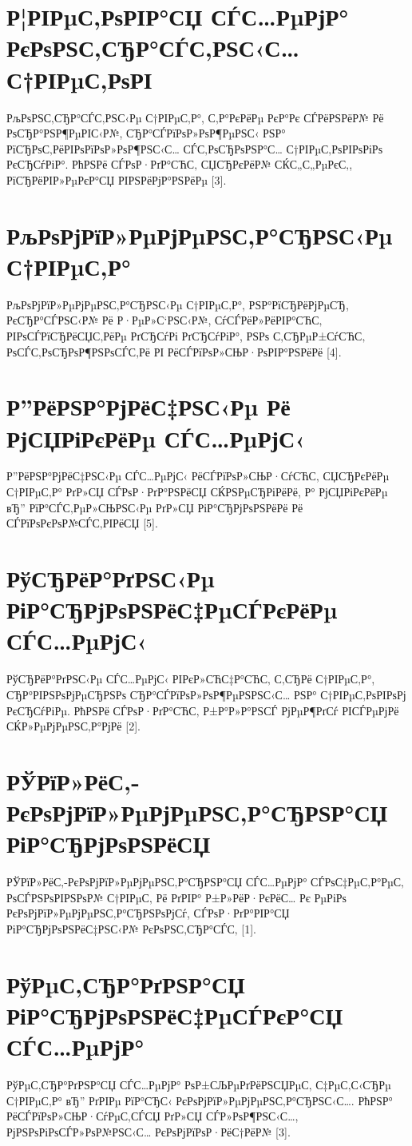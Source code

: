 \documentclass[referat, och, times]{SCWorks}
\begin{document}
	\section{Р¦РІРµС‚РѕРІР°СЏ СЃС…РµРјР° РєРѕРЅС‚СЂР°СЃС‚РЅС‹С… С†РІРµС‚РѕРІ}
	РљРѕРЅС‚СЂР°СЃС‚РЅС‹Рµ С†РІРµС‚Р°, С‚Р°РєРёРµ РєР°Рє СЃРёРЅРёР№ Рё РѕСЂР°РЅР¶РµРІС‹Р№, СЂР°СЃРїРѕР»РѕР¶РµРЅС‹ РЅР° РїСЂРѕС‚РёРІРѕРїРѕР»РѕР¶РЅС‹С… СЃС‚РѕСЂРѕРЅР°С… С†РІРµС‚РѕРІРѕРіРѕ РєСЂСѓРіР°. РћРЅРё СЃРѕР·РґР°СЋС‚ СЏСЂРєРёР№ СЌС„С„РµРєС‚, РїСЂРёРІР»РµРєР°СЏ РІРЅРёРјР°РЅРёРµ [3].
	
	\section{РљРѕРјРїР»РµРјРµРЅС‚Р°СЂРЅС‹Рµ С†РІРµС‚Р°}
	РљРѕРјРїР»РµРјРµРЅС‚Р°СЂРЅС‹Рµ С†РІРµС‚Р°, РЅР°РїСЂРёРјРµСЂ, РєСЂР°СЃРЅС‹Р№ Рё Р·РµР»С‘РЅС‹Р№, СѓСЃРёР»РёРІР°СЋС‚ РІРѕСЃРїСЂРёСЏС‚РёРµ РґСЂСѓРі РґСЂСѓРіР°, РЅРѕ С‚СЂРµР±СѓСЋС‚ РѕСЃС‚РѕСЂРѕР¶РЅРѕСЃС‚Рё РІ РёСЃРїРѕР»СЊР·РѕРІР°РЅРёРё [4].
	
	\section{Р”РёРЅР°РјРёС‡РЅС‹Рµ Рё РјСЏРіРєРёРµ СЃС…РµРјС‹}
	Р”РёРЅР°РјРёС‡РЅС‹Рµ СЃС…РµРјС‹ РёСЃРїРѕР»СЊР·СѓСЋС‚ СЏСЂРєРёРµ С†РІРµС‚Р° РґР»СЏ СЃРѕР·РґР°РЅРёСЏ СЌРЅРµСЂРіРёРё, Р° РјСЏРіРєРёРµ вЂ” РїР°СЃС‚РµР»СЊРЅС‹Рµ РґР»СЏ РіР°СЂРјРѕРЅРёРё Рё СЃРїРѕРєРѕР№СЃС‚РІРёСЏ [5].
	
	\section{РўСЂРёР°РґРЅС‹Рµ РіР°СЂРјРѕРЅРёС‡РµСЃРєРёРµ СЃС…РµРјС‹}
	РўСЂРёР°РґРЅС‹Рµ СЃС…РµРјС‹ РІРєР»СЋС‡Р°СЋС‚ С‚СЂРё С†РІРµС‚Р°, СЂР°РІРЅРѕРјРµСЂРЅРѕ СЂР°СЃРїРѕР»РѕР¶РµРЅРЅС‹С… РЅР° С†РІРµС‚РѕРІРѕРј РєСЂСѓРіРµ. РћРЅРё СЃРѕР·РґР°СЋС‚ Р±Р°Р»Р°РЅСЃ РјРµР¶РґСѓ РІСЃРµРјРё СЌР»РµРјРµРЅС‚Р°РјРё [2].
	
	\section{РЎРїР»РёС‚-РєРѕРјРїР»РµРјРµРЅС‚Р°СЂРЅР°СЏ РіР°СЂРјРѕРЅРёСЏ}
	РЎРїР»РёС‚-РєРѕРјРїР»РµРјРµРЅС‚Р°СЂРЅР°СЏ СЃС…РµРјР° СЃРѕС‡РµС‚Р°РµС‚ РѕСЃРЅРѕРІРЅРѕР№ С†РІРµС‚ Рё РґРІР° Р±Р»РёР·РєРёС… Рє РµРіРѕ РєРѕРјРїР»РµРјРµРЅС‚Р°СЂРЅРѕРјСѓ, СЃРѕР·РґР°РІР°СЏ РіР°СЂРјРѕРЅРёС‡РЅС‹Р№ РєРѕРЅС‚СЂР°СЃС‚ [1].
	
	\section{РўРµС‚СЂР°РґРЅР°СЏ РіР°СЂРјРѕРЅРёС‡РµСЃРєР°СЏ СЃС…РµРјР°}
	РўРµС‚СЂР°РґРЅР°СЏ СЃС…РµРјР° РѕР±СЉРµРґРёРЅСЏРµС‚ С‡РµС‚С‹СЂРµ С†РІРµС‚Р° вЂ” РґРІРµ РїР°СЂС‹ РєРѕРјРїР»РµРјРµРЅС‚Р°СЂРЅС‹С…. РћРЅР° РёСЃРїРѕР»СЊР·СѓРµС‚СЃСЏ РґР»СЏ СЃР»РѕР¶РЅС‹С…, РјРЅРѕРіРѕСЃР»РѕР№РЅС‹С… РєРѕРјРїРѕР·РёС†РёР№ [3].
	
\end{document}
